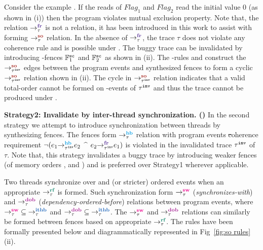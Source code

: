 Consider the example . If the reads of $Flag_1$ and $Flag_2$ 
read the initial value $0$ (as shown in (i)) 
then the program violates mutual exclusion
property. Note that, the relation $\setFR$ is not a \cc relation, it has
been introduced in this work to assist with forming $\setSO$ relation.
In the absence of $\setFR$, the trace $\tau$ does not violate any coherence
rule and is possible under \cc.
%
The buggy trace can be invalidated by introducing \sc-fences $\mathbb{F}^\sc_1$
and $\mathbb{F}^\sc_2$ as shown in (ii). The \lso-rules
 and  
construct the $\so{\inv{\tau}}{}{}$ edges between the program events 
and synthesized fences to form a cyclic $\so{\inv{\tau}}{}{}$ relation 
shown in (ii).
The cycle in $\so{\inv{\tau}}{}{}$ relation indicates that a valid 
total-order cannot be formed on \sc-events of $\inv{\tau}$ and thus the 
trace cannot be produced under \cc.\newline

\noindent
{\bf Strategy2: Invalidate by inter-thread synchronization.
(\wkfence)}\newline
In the second strategy we attempt to introduce synchronization
between threads by synthesizing fences. The fences form
$\setHB$ relation with program events \st coherence
requirement
$\neg(\hb{\inv{\tau}}{e_1}{e_2}$ $\^$ $\fr{\inv{\tau}}{e_2}{e_1})$ is
violated in the invalidated trace $\inv{\tau}$ of $\tau$.
%
Note that, this strategy invalidates a buggy trace by introducing 
weaker fences (of memory orders \rel, \acq and \acqrel) and 
is preferred over Strategy1 wherever applicable.

Two threads synchronize over \rel and \acq (or stricter) ordered
events when an appropriate $\setRF$ is formed. Such synchronization
form $\setSW$ ({\it synchronizes-with}) and $\setDOB$ 
({\it dependency-ordered-before}) relations between program events,
\cite{batty2011mathematizing}\cite{C11}
where $\setSW \subseteq \setITHB$ and $\setDOB \subseteq \setITHB$.
%
The $\setSW$ and $\setDOB$ relations can similarly be formed between
fences based on appropriate $\setRF$. 
The rules have been formally presented 
below and diagrammatically represented in Fig~\ref{fig:so rules}(ii).

